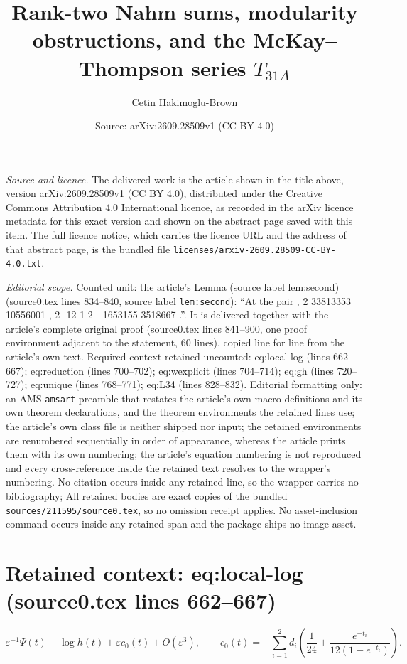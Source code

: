 \documentclass[10pt,a4paper]{amsart}
\title[Rank-two Nahm sums, modularity obstructions, and the McKay--Thompson series $T_{31A}$]{Rank-two Nahm sums, modularity obstructions, and the McKay--Thompson series $T_{31A}$}
\author{Cetin Hakimoglu-Brown}
\date{Source: arXiv:2609.28509v1 (CC BY 4.0)}
\theoremstyle{plain}
\theoremstyle{remark}
\begin{document}
\maketitle

\noindent\emph{Source and licence.} The delivered work is the article shown in the title above, version arXiv:2609.28509v1 (CC BY 4.0), distributed under the Creative Commons Attribution 4.0 International licence, as recorded in the arXiv licence metadata for this exact version and shown on the abstract page saved with this item. The full licence notice, which carries the licence URL and the address of that abstract page, is the bundled file \texttt{licenses/arxiv-2609.28509-CC-BY-4.0.txt}.
\par\smallskip

\noindent\textit{Editorial scope.} Counted unit: the article's Lemma (source label lem:second) (source0.tex lines 834--840, source label \texttt{lem:second}): ``At the pair , 2 33813353 10556001 , 2- 12 1 2 - 1653155 3518667 .''. It is delivered together with the article's complete original proof (source0.tex lines 841--900, one proof environment adjacent to the statement, 60 lines), copied line for line from the article's own text. Required context retained uncounted: eq:local-log (lines 662--667); eq:reduction (lines 700--702); eq:wexplicit (lines 704--714); eq:gh (lines 720--727); eq:unique (lines 768--771); eq:L34 (lines 828--832). Editorial formatting only: an AMS \texttt{amsart} preamble that restates the article's own macro definitions and its own theorem declarations, and the theorem environments the retained lines use; the article's own class file is neither shipped nor input; the retained environments are renumbered sequentially in order of appearance, whereas the article prints them with its own numbering; the article's equation numbering is not reproduced and every cross-reference inside the retained text resolves to the wrapper's numbering. No citation occurs inside any retained line, so the wrapper carries no bibliography; All retained bodies are exact copies of the bundled \texttt{sources/211595/source0.tex}, so no omission receipt applies. No asset-inclusion command occurs inside any retained span and the package ships no image asset.


\section*{Retained context: eq:local-log (source0.tex lines 662--667)}

\begin{equation}\label{eq:local-log}
 \varepsilon^{-1}\Psi(t)+\log h(t)+\varepsilon c_0(t)
   +O(\varepsilon^3),\qquad
 c_0(t)=-\sum_{i=1}^2d_i
       \left(\frac1{24}+\frac{e^{-t_i}}{12(1-e^{-t_i})}\right).
\end{equation}
\end{document}
